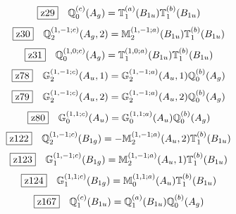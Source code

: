 \documentclass[fleqn,10pt,landscape]{jsarticle}
\begin{document}
\begin{dmath*}
\hspace*{3mm}\fbox{z29}\quad \mathbb{Q}_{0}^{(c)}(A_{g})=\mathbb{T}_{1}^{(a)}(B_{1u}) \mathbb{T}_{1}^{(b)}(B_{1u})
\end{dmath*}
\begin{dmath*}
\hspace*{3mm}\fbox{z30}\quad \mathbb{Q}_{2}^{(1,-1;c)}(A_{g},2)=\mathbb{M}_{2}^{(1,-1;a)}(B_{1u}) \mathbb{T}_{1}^{(b)}(B_{1u})
\end{dmath*}
\begin{dmath*}
\hspace*{3mm}\fbox{z31}\quad \mathbb{Q}_{0}^{(1,0;c)}(A_{g})=\mathbb{T}_{1}^{(1,0;a)}(B_{1u}) \mathbb{T}_{1}^{(b)}(B_{1u})
\end{dmath*}
\begin{dmath*}
\hspace*{3mm}\fbox{z78}\quad \mathbb{G}_{2}^{(1,-1;c)}(A_{u},1)=\mathbb{G}_{2}^{(1,-1;a)}(A_{u},1) \mathbb{Q}_{0}^{(b)}(A_{g})
\end{dmath*}
\begin{dmath*}
\hspace*{3mm}\fbox{z79}\quad \mathbb{G}_{2}^{(1,-1;c)}(A_{u},2)=\mathbb{G}_{2}^{(1,-1;a)}(A_{u},2) \mathbb{Q}_{0}^{(b)}(A_{g})
\end{dmath*}
\begin{dmath*}
\hspace*{3mm}\fbox{z80}\quad \mathbb{G}_{0}^{(1,1;c)}(A_{u})=\mathbb{G}_{0}^{(1,1;a)}(A_{u}) \mathbb{Q}_{0}^{(b)}(A_{g})
\end{dmath*}
\begin{dmath*}
\hspace*{3mm}\fbox{z122}\quad \mathbb{Q}_{2}^{(1,-1;c)}(B_{1g})=- \mathbb{M}_{2}^{(1,-1;a)}(A_{u},2) \mathbb{T}_{1}^{(b)}(B_{1u})
\end{dmath*}
\begin{dmath*}
\hspace*{3mm}\fbox{z123}\quad \mathbb{G}_{1}^{(1,-1;c)}(B_{1g})=\mathbb{M}_{2}^{(1,-1;a)}(A_{u},1) \mathbb{T}_{1}^{(b)}(B_{1u})
\end{dmath*}
\begin{dmath*}
\hspace*{3mm}\fbox{z124}\quad \mathbb{G}_{1}^{(1,1;c)}(B_{1g})=\mathbb{M}_{0}^{(1,1;a)}(A_{u}) \mathbb{T}_{1}^{(b)}(B_{1u})
\end{dmath*}
\begin{dmath*}
\hspace*{3mm}\fbox{z167}\quad \mathbb{Q}_{1}^{(c)}(B_{1u})=\mathbb{Q}_{1}^{(a)}(B_{1u}) \mathbb{Q}_{0}^{(b)}(A_{g})
\end{dmath*}
\end{document}
